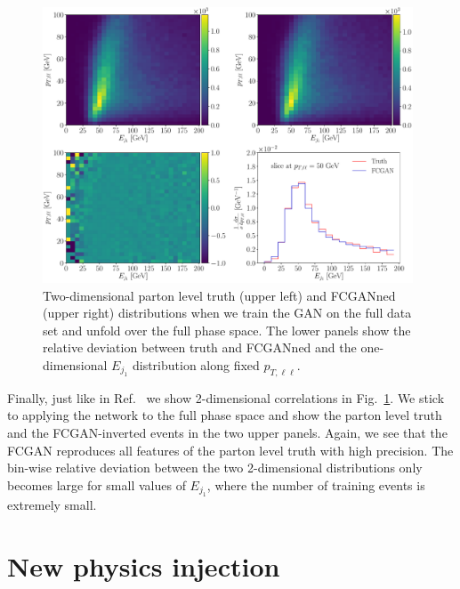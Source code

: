 \begin{figure}[t]
\centering
\includegraphics[width=0.98\textwidth]{figures/cGAN/cGAN_2d_corr}
\caption{Two-dimensional parton level truth (upper left) and FCGANned
  (upper right) distributions when we train the GAN on the full data
  set and unfold over the full phase space. The lower panels show the
  relative deviation between truth and FCGANned and the one-dimensional
  $E_{j_1}$ distribution along fixed $p_{T,\ell \ell}$.}
\label{fig:full_2d}
\end{figure}

Finally, just like in Ref.~\cite{gan_phasespace} we show 2-dimensional
correlations in Fig.~\ref{fig:full_2d}. We stick to applying the
network to the full phase space and show the parton level truth and
the FCGAN-inverted events in the two upper panels. Again, we see that
the FCGAN reproduces all features of the parton level truth with high
precision. The bin-wise relative deviation between the two 2-dimensional
distributions only becomes large for small values of $E_{j_1}$, where
the number of training events is extremely small.

\section{New physics injection}
\label{sec:closure}

